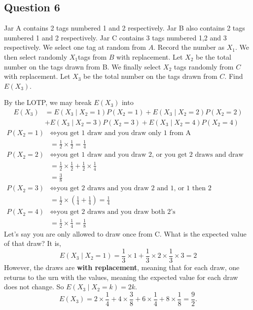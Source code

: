 \documentclass{article}
\begin{document}
\subsection*{Question 6}
Jar A contains 2 tags numbered 1 and 2 respectively. Jar B also contains 2 tags numbered 1 and 2 respectively. Jar C contains 3 tags numbered 1,2 and 3 respectively. We select one tag at random from $A$. Record the number as $X_1$. We then select randomly $X_1$tags from $B$ with replacement. Let $X_2$ be the total number on the tags drawn from B. We finally select $X_2$ tags randomly from $C$ with replacement. Let $X_3$ be the total number on the tags drawn from $C$. Find $E(X_3)$.

By the LOTP, we may break $E(X_3)$ into
\begin{align*}
    E(X_3) &= E(X_3 \mid X_2 = 1) P(X_2=1) + E(X_3 \mid X_2 = 2) P(X_2=2) \\
    &+E(X_3 \mid X_2 = 3) P(X_2=3) +E(X_3 \mid X_2 = 4) P(X_2=4)  
\end{align*}
\begin{align*}
    P(X_2=1) &\iff \text{you get 1 draw and you draw only 1 from A} \\
    &= \frac{1}{2} \times \frac{1}{2} = \frac{1}{4}\\
    P(X_2=2) &\iff \text{you get 1 draw and you draw 2, or you get 2 draws and draw both 1's} \\
    &= \frac{1}{2} \times \frac{1}{2} + \frac{1}{2} \times \frac{1}{4} \\
    &= \frac{3}{8} \\
    P(X_2=3) &\iff \text{you get 2 draws and you draw 2 and 1, or 1 then 2} \\
    &= \frac{1}{2} \times \left(\frac{1}{4} + \frac{1}{4} \right) = \frac{1}{4} \\
    P(X_2=4) &\iff \text{you get 2 draws and you draw both 2's} \\
    &= \frac{1}{2} \times \frac{1}{4} = \frac{1}{8}
\end{align*}
Let's say you are only allowed to draw once from C. What is the expected value of that draw? It is,
\begin{equation*}
    E(X_3 \mid X_2 = 1) = \frac{1}{3} \times 1 + \frac{1}{3} \times 2 \times \frac{1}{3} \times 3 = 2 
\end{equation*}
However, the draws are \textbf{with replacement}, meaning that for each draw, one returns to the urn with the values, meaning the expected value for each draw does not change. So $E(X_3 \mid X_2 = k)=2k$.
\begin{equation*}
    E(X_3) = 2 \times \frac{1}{4} + 4 \times \frac{3}{8} + 6 \times \frac{1}{4} + 8 \times \frac{1}{8} = \frac{9}{2}.
\end{equation*}
\end{document}
